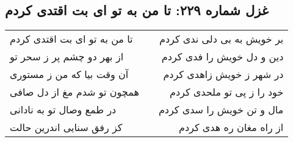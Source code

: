 \begin{center}
\section*{غزل شماره ۲۲۹: تا من به تو ای بت اقتدی کردم}
\label{sec:229}
\begin{longtable}{l p{0.5cm} r}
تا من به تو ای بت اقتدی کردم
&&
بر خویش به بی دلی ندی کردم
\\
از بهر دو چشم پر ز سحر تو
&&
دین و دل خویش را فدی کردم
\\
آن وقت بیا که من ز مستوری
&&
در شهر ز خویش زاهدی کردم
\\
همچون تو شدم مغ از دل صافی
&&
خود را ز پی تو ملحدی کردم
\\
در طمع وصال تو به نادانی
&&
مال و تن خویش را سدی کردم
\\
کز رفق سنایی اندرین حالت
&&
از راه مغان ره هدی کردم
\\
\end{longtable}
\end{center}
